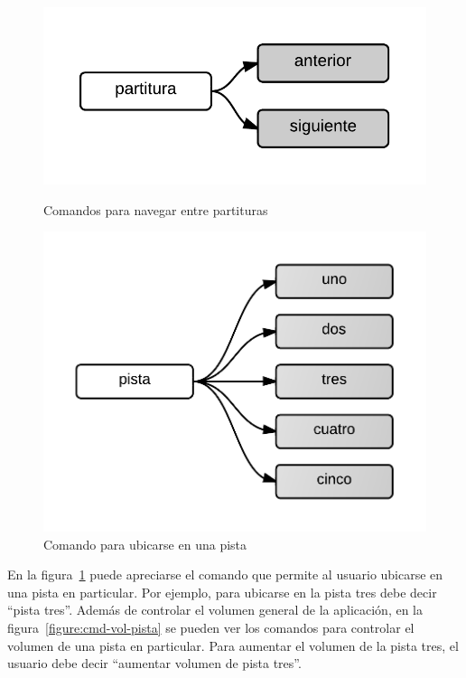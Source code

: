 \begin{figure}[H]
\begin{minipage}[b]{0.5\linewidth}
\centering
\includegraphics[width=0.6\linewidth]{./graphics/partitura-2.png}
\caption{Comandos para navegar entre partituras}
\label{figure:cmd-partitura-2}
\end{minipage}
\quad
\begin{minipage}[b]{0.5\linewidth}
\centering
\includegraphics[width=0.6\linewidth]{./graphics/cmd-pista-1.png}
\caption{Comando para ubicarse en una pista}
\label{figure:cmd-pista-1}
\end{minipage}
\end{figure} 

En la figura~\ref{figure:cmd-pista-1} puede apreciarse el comando que permite al usuario ubicarse 
en una pista en particular. Por ejemplo, para ubicarse en la pista tres debe decir “pista tres”. 
Adem\'as de controlar el volumen general de la aplicaci\'on, en 
la figura~\ref{figure:cmd-vol-pista} se pueden ver los comandos para controlar el volumen de una pista en 
particular. Para aumentar el volumen de la pista tres, el usuario debe 
decir ``aumentar volumen de pista tres''.

